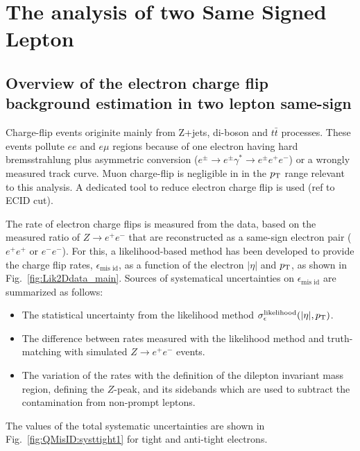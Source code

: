 \section{The  analysis of two Same Signed Lepton }
\label{sec:TwoLSS}

\subsection{Overview of the electron charge flip background estimation in two lepton same-sign}

Charge-flip events originite mainly from Z+jets, di-boson and $t\bar{t}$ processes. 
These events pollute $ee$ and $e\mu$ regions because of one electron having hard bremsstrahlung plus asymmetric conversion
($e^\pm \rightarrow e^\pm \gamma^* \rightarrow e^\pm e^+e^-$) or a wrongly measured track curve. Muon charge-flip is negligible in 
in the $p_{\mathrm{T}}$ range relevant to this analysis. A dedicated tool to reduce electron charge flip is 
used (ref to ECID cut).

The rate of electron charge flips is measured from the data, based on the measured ratio of $Z\rightarrow e^{+}e^{-}$ that are 
reconstructed as a same-sign electron pair ($e^{+}e^{+}$ or $e^{-}e^{-}$). For
this, a likelihood-based method has been developed to provide the charge flip
rates, $\epsilon_{\textrm{mis id}}$, as a function of the electron $|\eta|$
and $p_{\mathrm{T}}$, as shown in Fig.~\ref{fig:Lik2Ddata_main}. Sources of systematical
uncertainties on $\epsilon_{\textrm{mis id}}$ are summarized as follows:
\begin{itemize}
\item The statistical uncertainty from the likelihood method $\sigma_\epsilon^\mathrm{likelihood}(|\eta|,p_{\textrm T})$. 
\item The difference between rates measured with the likelihood method and truth-matching with simulated $Z\rightarrow e^+e^-$ events.
\item The variation of the rates with the definition of the dilepton invariant mass region, defining the $Z$-peak, and its sidebands which are used to subtract the contamination from non-prompt leptons.
\end{itemize}

The values of the total systematic uncertainties are shown in Fig.~\ref{fig:QMisID:systtight1} for tight and anti-tight electrons.

